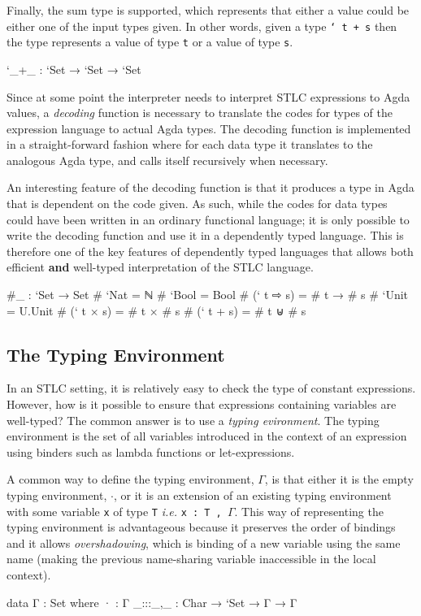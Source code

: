 \documentclass{article}
\begin{document}
Finally, the sum type is supported, which represents that either a value could be either one of the input types given. In other words,
given a type \texttt{` t + s} then the type represents a value of type \texttt{t} or a value of type \texttt{s}.

\begin{code}
    `_+_  : `Set → `Set → `Set
\end{code}

Since at some point the interpreter needs to interpret STLC expressions to Agda values\cite{Augustsson99anexercise}, a \textit{decoding} function is necessary to translate the
codes for types of the expression language to actual Agda types.
The decoding function is implemented in a straight-forward fashion where for each data type it translates to the analogous Agda type,
and calls itself recursively when necessary.

An interesting feature of the decoding function is that it produces a type in Agda that is dependent on the code given.
As such, while the codes for data types could have been written in an ordinary functional language; it is only possible to write the decoding function
and use it in a dependently typed language. This is therefore one of the key features of dependently typed languages that allows both efficient \textbf{and} well-typed interpretation of the STLC language.

\begin{code}
  #_ : `Set → Set
  # `Nat = ℕ
  # `Bool = Bool
  # (` t ⇨ s) = # t → # s
  # `Unit = U.Unit
  # (` t × s) = # t × # s
  # (` t + s) = # t ⊎ # s
\end{code}

\subsection{The Typing Environment}
\label{sub:TheTypingEnvironment}

In an STLC setting, it is relatively easy to check the type of constant expressions. However, how is it possible to ensure
that expressions containing variables are well-typed? The common answer is to use a \textit{typing evironment}. The typing
environment is the set of all variables introduced in the context of an expression using binders such as lambda
functions or let-expressions.

A common way to define the typing environment, \texttt{$\Gamma$}, is that either it is the empty typing environment, \texttt{$\cdot$},
or it is an extension of an existing typing environment with some variable \texttt{x} of type \texttt{T} \textit{i.e.} \texttt{x : T , $\Gamma$}.
This way of representing the typing environment is advantageous because it preserves the order of bindings and it allows \textit{overshadowing}, which is
binding of a new variable using the same name (making the previous name-sharing variable inaccessible in the local context).
\begin{code}
  data Γ : Set where
    ·         : Γ
    _:::_,_   : Char → `Set → Γ → Γ
\end{code}
\end{document}
